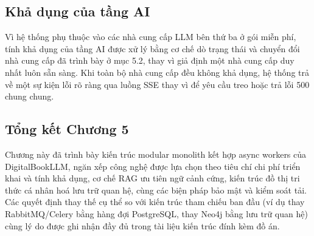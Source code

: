 \subsection{Khả dụng của tầng AI}
Vì hệ thống phụ thuộc vào các nhà cung cấp LLM bên thứ ba ở gói miễn phí, tính khả dụng của tầng AI được xử lý bằng cơ chế dò trạng thái và chuyển đổi nhà cung cấp đã trình bày ở mục 5.2, thay vì giả định một nhà cung cấp duy nhất luôn sẵn sàng. Khi toàn bộ nhà cung cấp đều không khả dụng, hệ thống trả về một sự kiện lỗi rõ ràng qua luồng SSE thay vì để yêu cầu treo hoặc trả lỗi 500 chung chung.

\subsection*{Tổng kết Chương 5}
Chương này đã trình bày kiến trúc modular monolith kết hợp async workers của DigitalBookLLM, ngăn xếp công nghệ được lựa chọn theo tiêu chí chi phí triển khai và tính khả dụng, cơ chế RAG ưu tiên ngữ cảnh cứng, kiến trúc đồ thị tri thức cá nhân hoá lưu trữ quan hệ, cùng các biện pháp bảo mật và kiểm soát tải. Các quyết định thay thế cụ thể so với kiến trúc tham chiếu ban đầu (ví dụ thay RabbitMQ/Celery bằng hàng đợi PostgreSQL, thay Neo4j bằng lưu trữ quan hệ) cùng lý do được ghi nhận đầy đủ trong tài liệu kiến trúc đính kèm đồ án.
